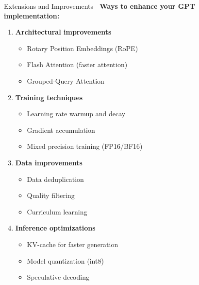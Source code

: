 \documentclass[aspectratio=169]{beamer}
\begin{document}
\begin{frame}[shrink=10]{Extensions and Improvements 🚀}
    \textbf{Ways to enhance your GPT implementation:}

    \vspace{0.3cm}

    \begin{enumerate}\setlength{\itemsep}{0pt}
        \item \textbf{Architectural improvements}
        \begin{itemize}\setlength{\itemsep}{0pt}
            \item Rotary Position Embeddings (RoPE)
            \item Flash Attention (faster attention)
            \item Grouped-Query Attention
        \end{itemize}

        \item \textbf{Training techniques}
        \begin{itemize}\setlength{\itemsep}{0pt}
            \item Learning rate warmup and decay
            \item Gradient accumulation
            \item Mixed precision training (FP16/BF16)
        \end{itemize}

        \item \textbf{Data improvements}
        \begin{itemize}\setlength{\itemsep}{0pt}
            \item Data deduplication
            \item Quality filtering
            \item Curriculum learning
        \end{itemize}

        \item \textbf{Inference optimizations}
        \begin{itemize}\setlength{\itemsep}{0pt}
            \item KV-cache for faster generation
            \item Model quantization (int8)
            \item Speculative decoding
        \end{itemize}
    \end{enumerate}
\end{frame}
\end{document}
